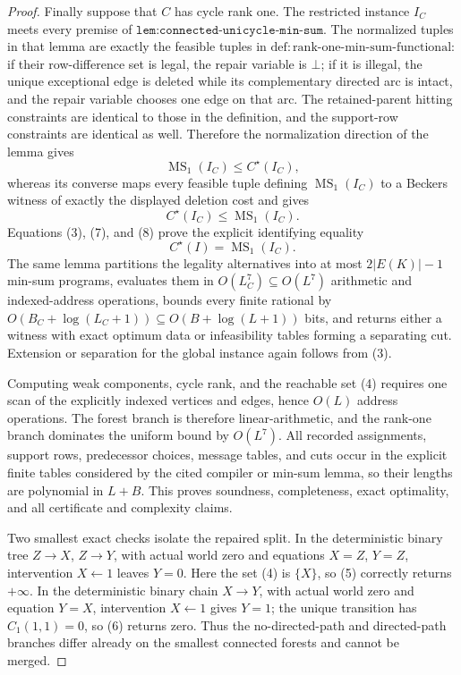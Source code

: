 \documentclass{article}
\begin{document}
\begin{proof}
Finally suppose that \(C\) has cycle rank one.  The restricted instance \(I_C\) meets every premise of \(\texttt{lem:connected-unicycle-min-sum}\).  The normalized tuples in that lemma are exactly the feasible tuples in \(\mathrm{def:rank\mbox{-}one\mbox{-}min\mbox{-}sum\mbox{-}functional}\): if their row-difference set is legal, the repair variable is \(\bot\); if it is illegal, the unique exceptional edge is deleted while its complementary directed arc is intact, and the repair variable chooses one edge on that arc.  The retained-parent hitting constraints are identical to those in the definition, and the support-row constraints are identical as well.  Therefore the normalization direction of the lemma gives
\[
 \operatorname{MS}_1(I_C)\le C^\star(I_C),                                 \tag{7}
\]
whereas its converse maps every feasible tuple defining \(\operatorname{MS}_1(I_C)\) to a Beckers witness of exactly the displayed deletion cost and gives
\[
 C^\star(I_C)\le\operatorname{MS}_1(I_C).                                  \tag{8}
\]
Equations (3), (7), and (8) prove the explicit identifying equality
\[
 C^\star(I)=\operatorname{MS}_1(I_C).                                       \tag{9}
\]
The same lemma partitions the legality alternatives into at most \(2|E(K)|-1\) min-sum programs, evaluates them in \(O(L_C^7)\subseteq O(L^7)\) arithmetic and indexed-address operations, bounds every finite rational by \(O(B_C+\log(L_C+1))\subseteq O(B+\log(L+1))\) bits, and returns either a witness with exact optimum data or infeasibility tables forming a separating cut.  Extension or separation for the global instance again follows from (3).

Computing weak components, cycle rank, and the reachable set (4) requires one scan of the explicitly indexed vertices and edges, hence \(O(L)\) address operations.  The forest branch is therefore linear-arithmetic, and the rank-one branch dominates the uniform bound by \(O(L^7)\).  All recorded assignments, support rows, predecessor choices, message tables, and cuts occur in the explicit finite tables considered by the cited compiler or min-sum lemma, so their lengths are polynomial in \(L+B\).  This proves soundness, completeness, exact optimality, and all certificate and complexity claims.

Two smallest exact checks isolate the repaired split.  In the deterministic binary tree \(Z\to X\), \(Z\to Y\), with actual world zero and equations \(X=Z\), \(Y=Z\), intervention \(X\leftarrow1\) leaves \(Y=0\).  Here the set (4) is \(\{X\}\), so (5) correctly returns \(+\infty\).  In the deterministic binary chain \(X\to Y\), with actual world zero and equation \(Y=X\), intervention \(X\leftarrow1\) gives \(Y=1\); the unique transition has \(C_1(1,1)=0\), so (6) returns zero.  Thus the no-directed-path and directed-path branches differ already on the smallest connected forests and cannot be merged.
\end{proof}
\end{document}
